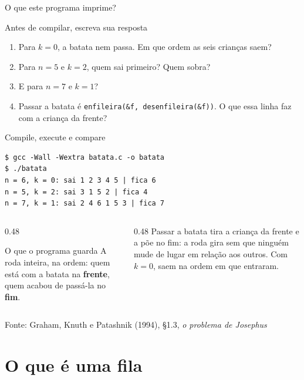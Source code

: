 \documentclass[aspectratio=169]{beamer}
\newcommand{\fonte}[1]{\vfill\hfill{\scriptsize\textcolor{UFSGray}{Fonte: #1}}}
\begin{document}
\begin{frame}{O que este programa imprime?}
  \begin{block}{Antes de compilar, escreva sua resposta}
    \begin{enumerate}
      \item Para $k = 0$, a batata nem passa. Em que ordem as seis crianças
        saem?
      \item Para $n = 5$ e $k = 2$, quem sai primeiro? Quem sobra?
      \item E para $n = 7$ e $k = 1$?
      \item Passar a batata é \texttt{enfileira(\&f, desenfileira(\&f))}. O
        que essa linha faz com a criança da frente?
    \end{enumerate}
  \end{block}
\end{frame}

\begin{frame}[fragile]{Compile, execute e compare}
\begin{lstlisting}[style=shellStyle]
$ gcc -Wall -Wextra batata.c -o batata
$ ./batata
n = 6, k = 0: sai 1 2 3 4 5 | fica 6
n = 5, k = 2: sai 3 1 5 2 | fica 4
n = 7, k = 1: sai 2 4 6 1 5 3 | fica 7
\end{lstlisting}
  \begin{columns}[T]
    \begin{column}{0.48\textwidth}
      \begin{block}{O que o programa guarda}
        \small A roda inteira, na ordem: quem está com a batata na
        \textbf{frente}, quem acabou de passá-la no \textbf{fim}.
      \end{block}
    \end{column}
    \begin{column}{0.48\textwidth}
      \small Passar a batata tira a criança da frente e a põe no fim: a roda
      gira sem que ninguém mude de lugar em relação aos outros. Com
      $k = 0$, saem na ordem em que entraram.
    \end{column}
  \end{columns}
  \fonte{Graham, Knuth e Patashnik (1994), §1.3, \emph{o problema de Josephus}~\cite{graham1994concrete}}
\end{frame}

\section{O que é uma fila}
\end{document}
